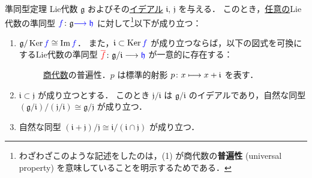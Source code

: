 \documentclass[rep_main]{subfiles}
\begin{document}
\begin{myprop}[label=prop:homo]{準同型定理}
    Lie代数 $\mathfrak{g}$ およびその\hyperref[def:ideal-LieAlg]{イデアル} $\mathfrak{i},\, \mathfrak{j}$ を与える．
    このとき，\underline{任意の}Lie代数の準同型 $\textcolor{blue}{f} \colon \mathfrak{g} \textcolor{blue}{\longrightarrow \mathfrak{h}}$ に対して\footnote{わざわざこのような記述をしたのは，(1) が商代数の\textbf{普遍性} (universal property) を意味していることを明示するためである．}以下が成り立つ：
    \begin{enumerate}
        \item $\mathfrak{g}/\operatorname{Ker} \textcolor{blue}{f} \cong \Im \textcolor{blue}{f}$．
        また，$\mathfrak{i} \subset \operatorname{Ker} \textcolor{blue}{f}$ が成り立つならば，以下の図式を可換にするLie代数の準同型 $\textcolor{red}{\overline{f}} \colon \mathfrak{g}/\mathfrak{i} \longrightarrow \textcolor{blue}{\mathfrak{h}}$ が一意的に存在する：
        \begin{figure}[H]
            \centering
            \caption{\hyperref[def:quotient-LieAlg]{商代数}の普遍性．$p$ は標準的射影 $p \colon x \longmapsto x + \mathfrak{i}$ を表す．}
            \label{cmtd:1st-homo}
        \end{figure}%
        \item $\mathfrak{i} \subset \mathfrak{j}$ が成り立つとする．
        このとき $\mathfrak{j}/\mathfrak{i}$ は $\mathfrak{g}/\mathfrak{i}$ のイデアルであり，自然な同型 $(\mathfrak{g}/\mathfrak{i})/(\mathfrak{j}/\mathfrak{i}) \cong \mathfrak{g} / \mathfrak{j}$ が成り立つ．
        \item 自然な同型 $(\mathfrak{i} + \mathfrak{j}) / \mathfrak{j} \cong \mathfrak{i} / (\mathfrak{i} \cap \mathfrak{j})$ が成り立つ．
    \end{enumerate}
\end{myprop}
\end{document}
